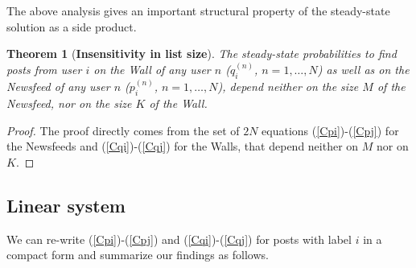 \documentclass[10pt, conference, letterpaper]{IEEEtran}
\newtheorem{theo}{Theorem}
\begin{document}
{%


The above analysis gives an important structural property of the steady-state solution as a side product.

\begin{theo}[\textbf{Insensitivity in list size}]
The steady-state probabilities to find posts from user $i$ on the Wall of any user $n$ ($q_i^{(n)}$, $n=1,\ldots,N$) as well as on the Newsfeed of any user $n$ ($p_i^{(n)}$, $n=1,\ldots,N$), depend neither on the size $M$ of the Newsfeed, nor on the size $K$ of the Wall.
\end{theo}
\begin{proof}
The proof directly comes from the set of $2N$ equations (\ref{Cpi})-(\ref{Cpj}) for the Newsfeeds and (\ref{Cqi})-(\ref{Cqj}) for the Walls, that depend neither on $M$ nor on $K$.
\end{proof}



\subsection{Linear system}

We can re-write {(\ref{Cpi})-(\ref{Cpj}) and (\ref{Cqi})-(\ref{Cqj}) for posts with label $i$} in a compact form and summarize our findings as follows.%

}
\end{document}
